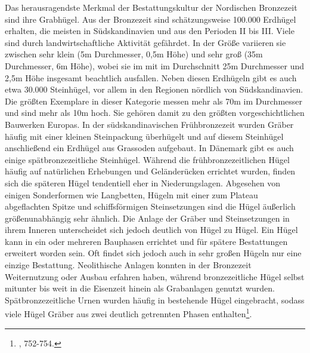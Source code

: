 \documentclass[openany,twoside,twocolumn]{book}
\let\rmarkdownfootnote\footnote%
\def\footnote{\protect\rmarkdownfootnote}
\begin{document}
Das herausragendste Merkmal der Bestattungskultur der Nordischen
Bronzezeit sind ihre Grabhügel. Aus der Bronzezeit sind schätzungsweise
100.000 Erdhügel erhalten, die meisten in Südskandinavien und aus den
Perioden II bis III. Viele sind durch landwirtschaftliche Aktivität
gefährdet. In der Größe variieren sie zwischen sehr klein (5m
Durchmesser, 0,5m Höhe) und sehr groß (35m Durchmesser, 6m Höhe), wobei
sie im mit im Durchschnitt 25m Durchmesser und 2,5m Höhe insgesamt
beachtlich ausfallen. Neben diesen Erdhügeln gibt es auch etwa 30.000
Steinhügel, vor allem in den Regionen nördlich von Südskandinavien. Die
größten Exemplare in dieser Kategorie messen mehr als 70m im Durchmesser
und sind mehr als 10m hoch. Sie gehören damit zu den größten
vorgeschichtlichen Bauwerken Europas. In der südskandinavischen
Frühbronzezeit wurden Gräber häufig mit einer kleinen Steinpackung
überhügelt und auf diesem Steinhügel anschließend ein Erdhügel aus
Grassoden aufgebaut. In Dänemark gibt es auch einige spätbronzezeitliche
Steinhügel. Während die frühbronzezeitlichen Hügel häufig auf
natürlichen Erhebungen und Geländerücken errichtet wurden, finden sich
die späteren Hügel tendentiell eher in Niederungslagen. Abgesehen von
einigen Sonderformen wie Langbetten, Hügeln mit einer zum Plateau
abgeflachten Spitze und schiffsförmigen Steinsetzungen sind die Hügel
äußerlich größenunabhängig sehr ähnlich. Die Anlage der Gräber und
Steinsetzungen in ihrem Inneren unterscheidet sich jedoch deutlich von
Hügel zu Hügel. Ein Hügel kann in ein oder mehreren Bauphasen errichtet
und für spätere Bestattungen erweitert worden sein. Oft findet sich
jedoch auch in sehr großen Hügeln nur eine einzige Bestattung.
Neolithische Anlagen konnten in der Bronzezeit Weiternutzung oder Ausbau
erfahren haben, während bronzezeitliche Hügel selbst mitunter bis weit
in die Eisenzeit hinein als Grabanlagen genutzt wurden.
Spätbronzezeitliche Urnen wurden häufig in bestehende Hügel eingebracht,
sodass viele Hügel Gräber aus zwei deutlich getrennten Phasen
enthalten\footnote{\textcite{thrane_scandinavia_2013}, 752-754.}.
\end{document}
